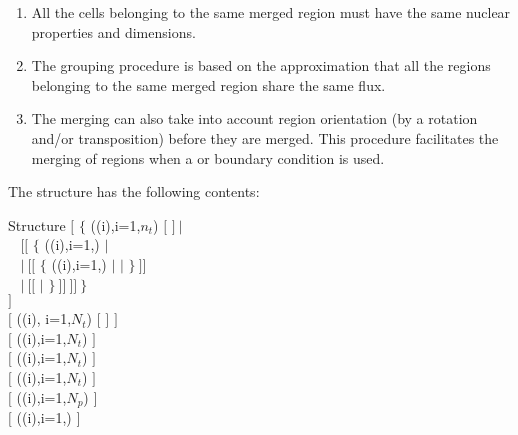 \begin{enumerate}

\item All the cells belonging to the same merged region must have the same
nuclear properties and dimensions. 

\item The grouping procedure is based on the approximation that all the regions
belonging to the same merged region share the same flux. 

\item The merging can also take into account region orientation  (by a rotation
and/or transposition) before they are merged. This procedure facilitates the
merging of regions when a  or  boundary condition is used. 

\end{enumerate}
The  structure has the following contents: 

\begin{DataStructure}{Structure }
$[$  $\{$  ((i),i=1,$n_t$) $[$  $]~|$\\
$~~~~[[$   $\{$ ((i),i=1,) $|$  \\
$~~~~|~[[$  $\{$ ((i),i=1,) $|$   $|$   $\}~]]$\\
$~~~~|~[[$     $|$   $\}~]]~]]~\}$\\
$]$\\
$[$   ((i), i=1,$N_t$) $[$  $]$ $]$\\
$[$   ((i),i=1,$N_t$) $]$\\
$[$  ((i),i=1,$N_t$) $]$\\
$[$   ((i),i=1,$N_t$) $]$\\
$[$  ((i),i=1,$N_p$) $]$\\
$[$  ((i),i=1,) $]$
\end{DataStructure}

\noindent

